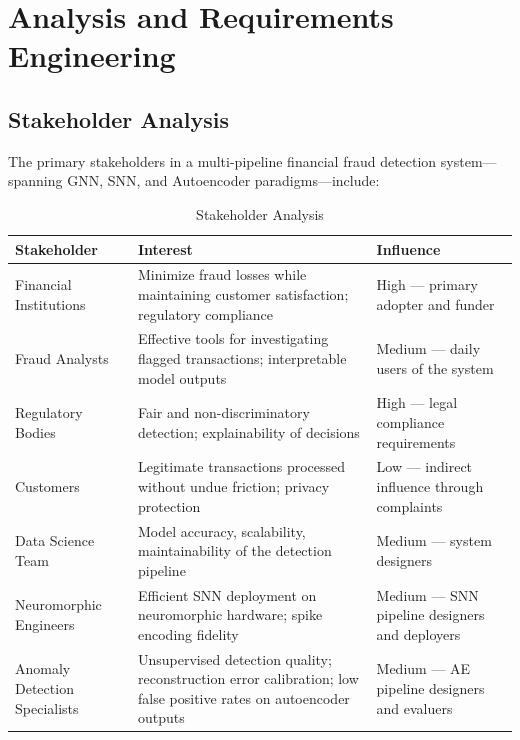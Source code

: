 \chapter{Analysis and Requirements Engineering}
\label{ch:requirements}
\label{ch:methodology}

\section{Stakeholder Analysis}

The primary stakeholders in a multi-pipeline financial fraud detection system---spanning GNN, SNN, and Autoencoder paradigms---include:

\begin{table}[H]
\centering
\caption{Stakeholder Analysis}
\label{tab:stakeholders}
\small
\begin{tabularx}{\textwidth}{lLX}
\toprule
\textbf{Stakeholder} & \textbf{Interest} & \textbf{Influence} \\
\midrule
Financial Institutions & Minimize fraud losses while maintaining customer satisfaction; regulatory compliance & High --- primary adopter and funder \\
Fraud Analysts & Effective tools for investigating flagged transactions; interpretable model outputs & Medium --- daily users of the system \\
Regulatory Bodies & Fair and non-discriminatory detection; explainability of decisions & High --- legal compliance requirements \\
Customers & Legitimate transactions processed without undue friction; privacy protection & Low --- indirect influence through complaints \\
Data Science Team & Model accuracy, scalability, maintainability of the detection pipeline & Medium --- system designers \\
Neuromorphic Engineers & Efficient SNN deployment on neuromorphic hardware; spike encoding fidelity & Medium --- SNN pipeline designers and deployers \\
Anomaly Detection Specialists & Unsupervised detection quality; reconstruction error calibration; low false positive rates on autoencoder outputs & Medium --- AE pipeline designers and evaluers \\
\bottomrule
\end{tabularx}
\end{table}

